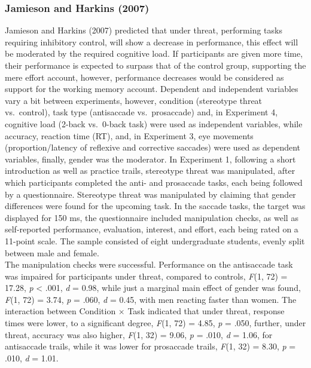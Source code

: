\documentclass[
  stu,floatsintext]{apa7}
\begin{document}
\subsubsection{Jamieson and Harkins (2007)}\label{jamiesonmereeffortstereotype2007}

Jamieson and Harkins (2007) predicted that under threat, performing tasks requiring inhibitory control, will show a decrease in performance, this effect will be moderated by the required cognitive load.
If participants are given more time, their performance is expected to surpass that of the control group, supporting the mere effort account, however, performance decreases would be considered as support for the working memory account.
Dependent and independent variables vary a bit between experiments, however, condition (stereotype threat vs.~control), task type (antisaccade vs.~prosaccade) and, in Experiment 4, cognitive load (2-back vs.~0-back task) were used as independent variables, while accuracy, reaction time (RT), and, in Experiment 3, eye movements (proportion/latency of reflexive and corrective saccades) were used as dependent variables, finally, gender was the moderator.
In Experiment 1, following a short introduction as well as practice trails, stereotype threat was manipulated, after which participants completed the anti- and prosaccade tasks, each being followed by a questionnaire.
Stereotype threat was manipulated by claiming that gender differences were found for the upcoming task.
In the saccade tasks, the target was displayed for 150 ms, the questionnaire included manipulation checks, as well as self-reported performance, evaluation, interest, and effort, each being rated on a 11-point scale.
The sample consisted of eight undergraduate students, evenly split between male and female.\\
The manipulation checks were successful.
Performance on the antisaccade task was impaired for participants under threat, compared to controls, \emph{F}(1, 72) = 17.28, \emph{p} \textless{} .001, \emph{d} = 0.98, while just a marginal main effect of gender was found, \emph{F}(1, 72) = 3.74, \emph{p} = .060, \emph{d} = 0.45, with men reacting faster than women.
The interaction between Condition \(\times\) Task indicated that under threat, response times were lower, to a significant degree, \emph{F}(1, 72) = 4.85, \emph{p} = .050, further, under threat, accuracy was also higher, \emph{F}(1, 32) = 9.06, \emph{p} = .010, \emph{d} = 1.06, for antisaccade trails, while it was lower for prosaccade trails, \emph{F}(1, 32) = 8.30, \emph{p} = .010, \emph{d} = 1.01.\\
\end{document}
